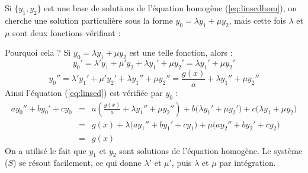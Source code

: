 \documentclass[class=report,crop=false]{standalone}
\begin{document}
Si $\{y_1,y_2\}$ est une base de solutions de l'équation homogène (\ref{eq:linscdhom}),
on cherche une solution particulière sous la forme
$y_0= \lambda y_1 + \mu y_2$, mais cette fois $\lambda$ et $\mu$ sont deux fonctions
vérifiant :


Pourquoi cela ?
Si $y_0= \lambda y_1 + \mu y_2$ est une telle fonction, alors :
$$y_0'= \lambda' y_1 + \mu' y_2 + \lambda y_1' + \mu y_2' = \lambda y_1'+ \mu y_2'$$
$$y_0'' = \lambda' y_1'+ \mu' y_2' + \lambda y_1''+ \mu y_2'' = \frac{g(x)}{a} + \lambda y_1''+ \mu y_2''$$
Ainsi l'équation (\ref{eq:linscd}) est vérifiée par $y_0$ :
\begin{eqnarray*}
 ay_0''+by_0'+cy_0
   &=& a\left(\frac{g(x)}{a} + \lambda y_1''+ \mu y_2''\right) + b\big(\lambda y_1'+ \mu y_2'\big) + c\big(\lambda y_1 + \mu y_2\big)\\
   &=& g(x) + \lambda\big(ay_1''+by_1'+cy_1\big) + \mu\big(ay_2''+by_2'+cy_2\big)\\
   &=& g(x)
\end{eqnarray*}
On a utilisé le fait que $y_1$ et $y_2$ sont solutions de l'équation homogène.
Le système ($S$) se résout facilement, ce qui donne $\lambda'$ et $\mu'$,
puis $\lambda$ et $\mu$ par intégration.
\end{document}
